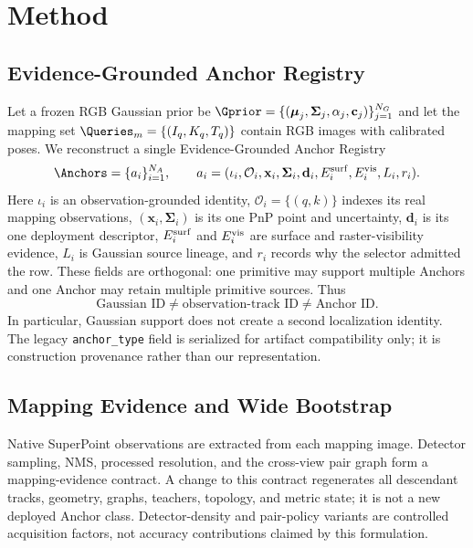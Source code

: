 \section{Method}

\subsection{Evidence-Grounded Anchor Registry}

Let a frozen RGB Gaussian prior be
$\Gprior=\{(\boldsymbol\mu_j,\boldsymbol\Sigma_j,
\alpha_j,\mathbf{c}_j)\}_{j=1}^{N_G}$ and let the mapping set
$\Queries_m=\{(I_q,K_q,T_q)\}$ contain RGB images with calibrated poses. We
reconstruct a single Evidence-Grounded Anchor Registry
\begin{equation}
  \Anchors=\{a_i\}_{i=1}^{N_A},\qquad
  a_i=(\iota_i,\mathcal O_i,\mathbf{x}_i,\mathbf\Sigma_i,
  \mathbf d_i,E_i^{\rm surf},E_i^{\rm vis},L_i,r_i).
\end{equation}
Here $\iota_i$ is an observation-grounded identity,
$\mathcal O_i=\{(q,k)\}$ indexes its real mapping observations,
$(\mathbf{x}_i,\mathbf\Sigma_i)$ is its one PnP point and uncertainty,
$\mathbf d_i$ is its one deployment descriptor, $E_i^{\rm surf}$ and
$E_i^{\rm vis}$ are surface and raster-visibility evidence, $L_i$ is Gaussian
source lineage, and $r_i$ records why the selector admitted the row. These
fields are orthogonal: one primitive may support multiple Anchors and one
Anchor may retain multiple primitive sources. Thus
\begin{equation}
  \text{Gaussian ID}\neq\text{observation-track ID}\neq\text{Anchor ID}.
\end{equation}
In particular, Gaussian support does not create a second localization identity.
The legacy \texttt{anchor\_type} field is serialized for artifact compatibility
only; it is construction provenance rather than our representation.

\subsection{Mapping Evidence and Wide Bootstrap}

Native SuperPoint observations are extracted from each mapping image. Detector
sampling, NMS, processed resolution, and the cross-view pair graph form a
mapping-evidence contract. A change to this contract regenerates all descendant
tracks, geometry, graphs, teachers, topology, and metric state; it is not a new
deployed Anchor class. Detector-density and pair-policy variants are controlled
acquisition factors, not accuracy contributions claimed by this formulation.

